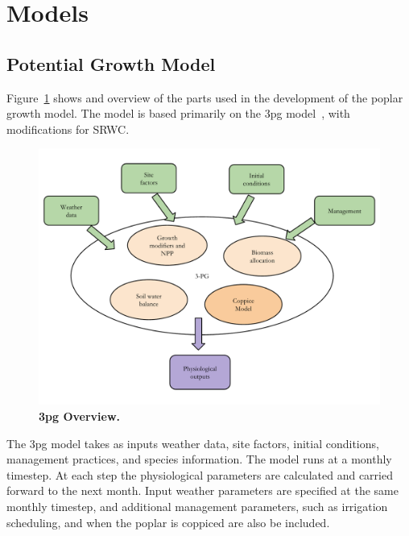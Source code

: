 \documentclass[10pt]{article}
\begin{document}
\section*{Models}

\subsection*{Potential Growth Model}

Figure~\ref{fig:growth-model} shows and overview of the parts used in
the development of the poplar growth model. The model is based
primarily on the \ac{3pg} model~\cite{Landsberg1997,
  landsberg2010physiological}, with modifications for \ac{SRWC}.

\begin{figure}[!ht]
\includegraphics[width=1.0\linewidth]{model_overview}
\caption{ \textbf{\ac{3pg} Overview.}}
\label{fig:growth-model}
\end{figure}

The \acf{3pg} model takes as inputs weather data, site factors,
initial conditions, management practices, and species information.
The model runs at a monthly timestep. At each step the physiological
parameters are calculated and carried forward to the next month. Input
weather parameters are specified at the same monthly timestep, and
additional management parameters, such as irrigation scheduling, and
when the poplar is coppiced are also be included.
\end{document}
